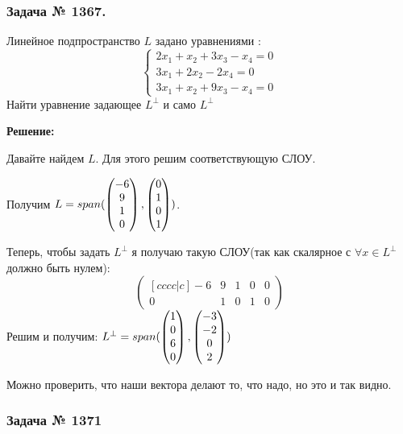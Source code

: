 \subsubsection{Задача № 1367.}

Линейное подпространство $L$ задано уравнениями :
$$
\begin{cases}
    2x_1  + x_2 + 3x_3 -x_4 = 0\\
    3x_1 + 2x_2 -2x_4 = 0\\
    3x_1 +x_2 + 9x_3-x_4=0
\end{cases}$$
Найти уравнение задающее $L^\perp$ и само $L^\perp$

\textbf{Решение:}

Давайте найдем $L$. Для этого решим соответствующую СЛОУ. 

Получим $L = \span (\begin{pmatrix}
    -6 \\
    9 \\
    1\\0
    
\end{pmatrix}, \begin{pmatrix}
    0 \\
    1\\
    0\\
    1\\
\end{pmatrix})$.

Теперь, чтобы задать $L^\perp$ я получаю такую СЛОУ(так как скалярное с $\forall x \in L^\perp$ должно быть нулем):
$$\begin{pmatrix}[cccc|c]
    -6 & 9 & 1 & 0 & 0\\
    0 & 1 & 0 & 1 & 0
\end{pmatrix}$$
Решим и получим: $L^\perp = span (\begin{pmatrix}
    1 \\ 0
    \\ 6\\0
\end{pmatrix},\begin{pmatrix}
    -3 \\
    -2 \\
    0\\
    2
\end{pmatrix})$

Можно проверить, что наши вектора делают то, что надо, но это и так видно.
\subsubsection{Задача № 1371}

